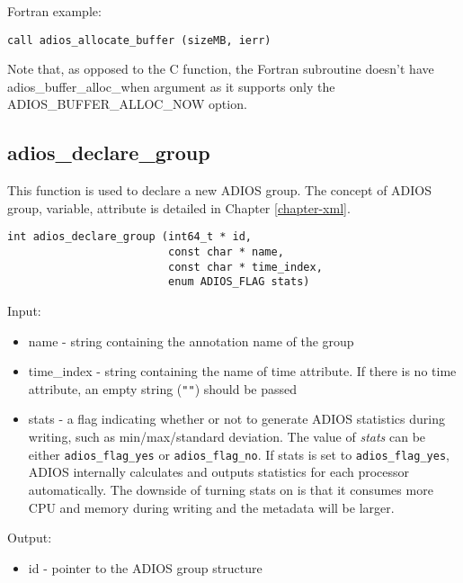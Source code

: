 Fortran example: 
\begin{lstlisting}[alsolanguage=Fortran,caption={},label={}]
call adios_allocate_buffer (sizeMB, ierr)
\end{lstlisting}

Note that, as opposed to the C function, the Fortran subroutine doesn't have 
adios\_buffer\_alloc\_when argument as it supports only the 
{\small ADIOS\_BUFFER\_ALLOC\_NOW} option.


\subsection{adios\_declare\_group}

This function is used to declare a new ADIOS group. The concept of ADIOS group, variable, 
attribute is detailed in Chapter \ref{chapter-xml}.

\begin{lstlisting}[alsolanguage=C,caption={},label={}]
int adios_declare_group (int64_t * id, 
                         const char * name,
                         const char * time_index,
                         enum ADIOS_FLAG stats)
\end{lstlisting}

Input: 

\begin{itemize}
\item name - string containing the annotation name of the group 

\item time\_index - string containing the name of time attribute. If there is no time 
attribute, an empty string (\verb+""+) should be passed

\item stats - a flag indicating whether or not to generate ADIOS statistics during writing, 
such as min/max/standard deviation. The value of \textit{stats} can be either 
\verb+adios_flag_yes+ or \verb+adios_flag_no+. If stats is set to \verb+adios_flag_yes+, 
ADIOS internally calculates and outputs statistics for each processor automatically. 
The downside of turning stats on is that it consumes more CPU and memory during writing 
and the metadata will be larger. 
\end{itemize}

Output: 
\begin{itemize}
\item id - pointer to the ADIOS group structure
\end{itemize}

